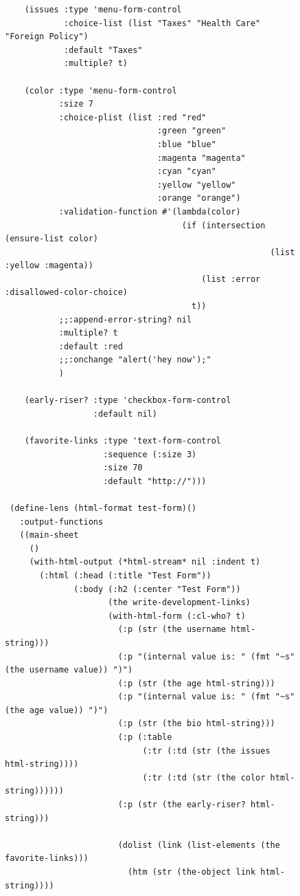 \documentclass [11pt]{book}
\begin{document}
\begin{itemize}
\begin{figure}
\begin{lrbox}{\boxedverb}
\begin{minipage}{\linewidth}
{\begin{verbatim}
    (issues :type 'menu-form-control
            :choice-list (list "Taxes" "Health Care" "Foreign Policy")
            :default "Taxes"
            :multiple? t)
   
    (color :type 'menu-form-control
           :size 7
           :choice-plist (list :red "red" 
                               :green "green" 
                               :blue "blue" 
                               :magenta "magenta" 
                               :cyan "cyan" 
                               :yellow "yellow" 
                               :orange "orange")
           :validation-function #'(lambda(color)
                                    (if (intersection (ensure-list color) 
                                                      (list :yellow :magenta))
                                        (list :error :disallowed-color-choice)
                                      t))
           ;;:append-error-string? nil
           :multiple? t
           :default :red
           ;;:onchange "alert('hey now');" 
           )
   
    (early-riser? :type 'checkbox-form-control
                  :default nil)
   
    (favorite-links :type 'text-form-control
                    :sequence (:size 3)
                    :size 70
                    :default "http://")))

 (define-lens (html-format test-form)()
   :output-functions
   ((main-sheet
     ()
     (with-html-output (*html-stream* nil :indent t)
       (:html (:head (:title "Test Form"))
              (:body (:h2 (:center "Test Form"))
                     (the write-development-links)
                     (with-html-form (:cl-who? t)
                       (:p (str (the username html-string)))
                       (:p "(internal value is: " (fmt "~s" (the username value)) ")")
                       (:p (str (the age html-string)))
                       (:p "(internal value is: " (fmt "~s" (the age value)) ")")
                       (:p (str (the bio html-string)))
                       (:p (:table 
                            (:tr (:td (str (the issues html-string))))
                            (:tr (:td (str (the color html-string))))))
                       (:p (str (the early-riser? html-string)))
                      
                       (dolist (link (list-elements (the favorite-links)))
                         (htm (str (the-object link html-string))))
                      

\end{verbatim}}
\end{minipage}
\end{lrbox}
\end{figure}
\end{itemize}
\end{document}
